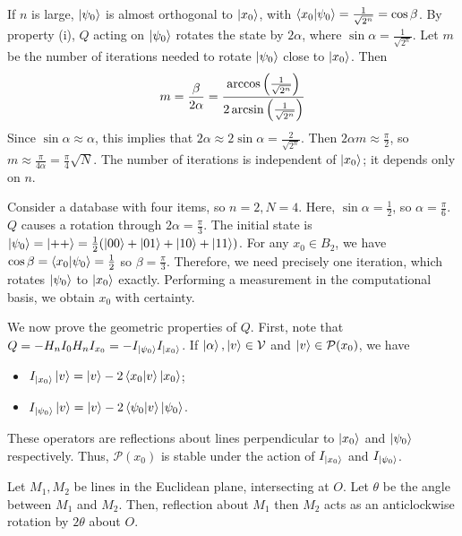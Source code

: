 If \( n \) is large, \( \ket{\psi_0} \) is almost orthogonal to \( \ket{x_0} \), with \( \ip{x_0}{\psi_0} = \frac{1}{\sqrt{2^n}} = \cos \beta \).
By property (i), \( Q \) acting on \( \ket{\psi_0} \) rotates the state by \( 2\alpha \), where \( \sin\alpha = \frac{1}{\sqrt{2^n}} \).
Let \( m \) be the number of iterations needed to rotate \( \ket{\psi_0} \) close to \( \ket{x_0} \).
Then
\[ m = \frac{\beta}{2\alpha} = \frac{\arccos\qty(\frac{1}{\sqrt{2^n}})}{2\arcsin\qty(\frac{1}{\sqrt{2^n}})} \]
Since \( \sin \alpha \approx \alpha \), this implies that \( 2\alpha \approx 2\sin\alpha = \frac{2}{\sqrt{2^n}} \).
Then \( 2 \alpha m \approx \frac{\pi}{2} \), so \( m \approx \frac{\pi}{4\alpha} = \frac{\pi}{4} \sqrt{N} \).
The number of iterations is independent of \( \ket{x_0} \); it depends only on \( n \).
\begin{example}
    Consider a database with four items, so \( n = 2, N = 4 \).
    Here, \( \sin \alpha = \frac{1}{2} \), so \( \alpha = \frac{\pi}{6} \).
    \( Q \) causes a rotation through \( 2\alpha = \frac{\pi}{3} \).
    The initial state is \( \ket{\psi_0} = \ket{++} = \frac{1}{2}\qty(\ket{00} + \ket{01} + \ket{10} + \ket{11}) \).
    For any \( x_0 \in B_2 \), we have \( \cos\beta = \ip{x_0}{\psi_0} = \frac{1}{2} \) so \( \beta = \frac{\pi}{3} \).
    Therefore, we need precisely one iteration, which rotates \( \ket{\psi_0} \) to \( \ket{x_0} \) exactly.
    Performing a measurement in the computational basis, we obtain \( x_0 \) with certainty.
\end{example}
We now prove the geometric properties of \( Q \).
First, note that \( Q = -H_n I_0 H_n I_{x_0} = -I_{\ket{\psi_0}} I_{\ket{x_0}} \).
If \( \ket{\alpha}, \ket{v} \in \mathcal V \) and \( \ket{v} \in \mathcal P(x_0) \), we have
\begin{itemize}
    \item \( I_{\ket{x_0}} \ket{v} = \ket{v} - 2\ip{x_0}{v} \ket{x_0} \);
    \item \( I_{\ket{\psi_0}} \ket{v} = \ket{v} - 2\ip{\psi_0}{v} \ket{\psi_0} \).
\end{itemize}
These operators are reflections about lines perpendicular to \( \ket{x_0} \) and \( \ket{\psi_0} \) respectively.
Thus, \( \mathcal P(x_0) \) is stable under the action of \( I_{\ket{x_0}} \) and \( I_{\ket{\psi_0}} \).

Let \( M_1, M_2 \) be lines in the Euclidean plane, intersecting at \( O \).
Let \( \theta \) be the angle between \( M_1 \) and \( M_2 \).
Then, reflection about \( M_1 \) then \( M_2 \) acts as an anticlockwise rotation by \( 2\theta \) about \( O \).

